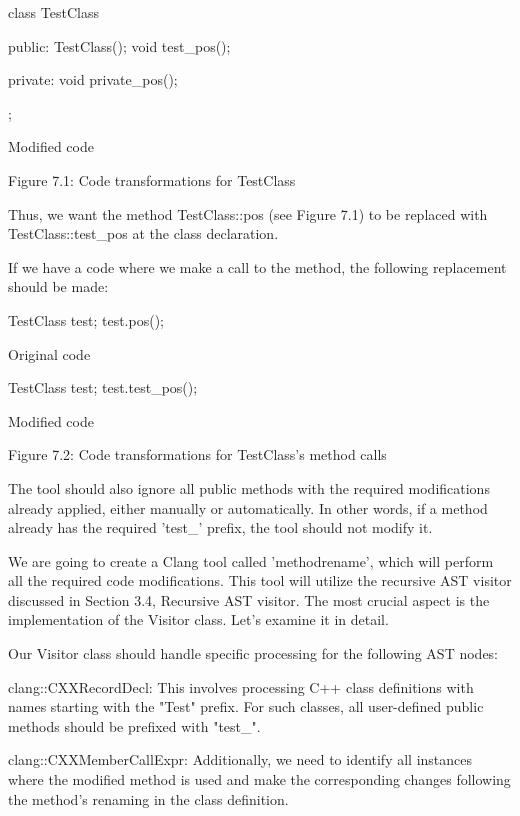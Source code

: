 \begin{cpp}
class TestClass {
public:
  TestClass(){};
  void test_pos(){};

private:
  void private_pos(){};
};
\end{cpp}

Modified code

\begin{center}
Figure 7.1: Code transformations for TestClass
\end{center}


Thus, we want the method TestClass::pos (see Figure 7.1) to be replaced with TestClass::test\_pos at the class declaration.

If we have a code where we make a call to the method, the following replacement should be made:

\begin{cpp}
TestClass test;
test.pos();
\end{cpp}

Original code

\begin{cpp}
TestClass test;
test.test_pos();
\end{cpp}

Modified code


\begin{center}
Figure 7.2: Code transformations for TestClass's method calls
\end{center}

The tool should also ignore all public methods with the required modifications already applied, either manually or automatically. In other words, if a method already has the required 'test\_' prefix, the tool should not modify it.

We are going to create a Clang tool called 'methodrename', which will perform all the required code modifications. This tool will utilize the recursive AST visitor discussed in Section 3.4, Recursive AST visitor. The most crucial aspect is the implementation of the Visitor class. Let's examine it in detail.


Our Visitor class should handle specific processing for the following AST nodes:

clang::CXXRecordDecl: This involves processing C++ class definitions with names starting with the "Test" prefix. For such classes, all user-defined public methods should be prefixed with "test\_".

clang::CXXMemberCallExpr: Additionally, we need to identify all instances where the modified method is used and make the corresponding changes following the method's renaming in the class definition.

